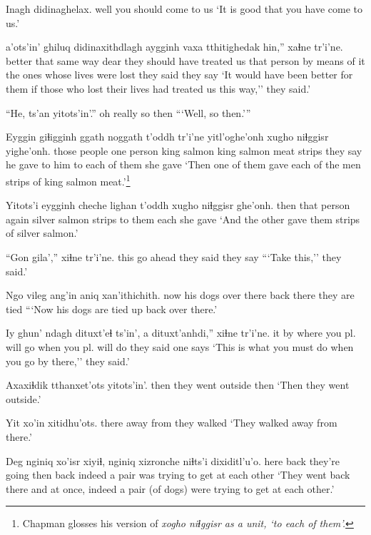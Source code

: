 \documentclass[12pt]{article}
\begin{document}
\gll Inagh didinaghelax.
well {you should come to us}
\glt `It is good that you have come to us.'
\glend

 a'ots'in' ghiluq didinaxithdlagh aygginh vaxa {tthitighedak hin,''}  xaɬne  tr'i'ne.
{better that}  {same way} dear {they should have treated us} {that person} {by means of it} {the ones whose lives were lost} {they said} {they say}
\glt `It would have been better for them if those who lost their lives had treated us this way,'' they said.'
\glend

\gll ``He, ts'an yitots'in'.''
{oh really} so then
\glt ```Well, so then.'''
\glend

\gll Eyggin giɬigginh ggath noggath t'oddh tr'i'ne yitl'oghe'onh  {xugho niɬggisr} yighe'onh.
{those people} {one person} {king salmon} {king salmon meat} strips {they say} {he gave to him} {to each of them}  {she gave}
\glt `Then one of them gave each of the men strips of king salmon meat.'\footnote{Chapman glosses his version of \em xogho niɬggisr \em as a unit, `to each of them'.}
\glend

\gll Yitots'i eygginh cheche lighan t'oddh xugho niɬggisr ghe'onh.
then  {that person} again  {silver salmon} strips {to them} each {she gave}
\glt `And the other gave them strips of silver salmon.'
\glend

\gll ``Gon gila','' xiɬne  tr'i'ne.
this {go ahead} {they said} {they say}
\glt ```Take this,'' they said.'
\glend

\gll Ngo vileg  ang'in aniq xan'ithichith.
now {his dogs} {over there} {back there} {they are tied}
\glt ```Now his dogs are tied up back over there.'
\glend

\gll Iy ghun'  ndagh dituxt'eɬ ts'in', a dituxt'anhdi,'' xiɬne tr'i'ne.
it by where {you pl. will go} {} {} {when you pl. will do}  {they said} {one says}
\glt `This is what you must do when you go by there,'' they said.'
\glend

\gll Axaxiɬdik tthanxet'ots  yitots'in'.
then  {they went outside} then
\glt `Then they went outside.'
\glend

\gll Yit xo'in  xitidhu'ots.
there {away from} {they walked}
\glt `They walked away from there.'
\glend

\gll Deg nginiq xo'isr xiyiɬ, nginiq xizronche  {niɬts'i dixiditl'u'o.}
here back  {they're going} then back  indeed   {a pair was trying to get at each other}
\glt `They went back there and at once, indeed a pair (of dogs) were trying to get at each other.'
\glend
\end{document}
